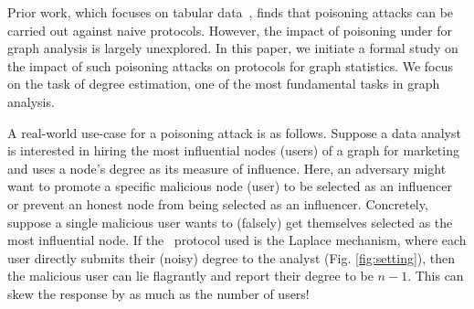 Prior work, which focuses on tabular data~\cite{Cheu21,Cao_USENIX21,Li22}, finds that  poisoning attacks can be carried out against naive \ldp{} protocols. However, the impact of poisoning under \ldp{} for graph analysis is largely unexplored. In this paper, we initiate a formal study on the impact of such poisoning attacks on \ldp{} protocols for graph statistics. We focus on the task of degree estimation, one of the most fundamental tasks in graph analysis. 

A real-world use-case for a poisoning attack is as follows. Suppose a data analyst is interested in hiring the most influential nodes (users) of a graph for marketing and uses a node's degree as its measure of influence.  Here, an adversary might want to promote a specific malicious node (user) to be selected as an influencer or prevent an honest node from being selected as an influencer. Concretely, suppose a single malicious user wants to (falsely) get themselves selected as the most influential node. If the \ldp~protocol used is the Laplace mechanism, where each user directly submits their (noisy) degree to the analyst (Fig. \ref{fig:setting}), then the malicious user can lie flagrantly and report their degree to be $n-1$. This can skew the response by as much as the number of users!





